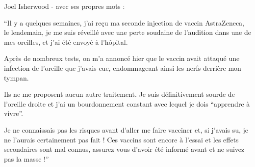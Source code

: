 Joel Isherwood - avec ses propres mots :

“Il y a quelques semaines, j'ai reçu ma seconde injection de vaccin AstraZeneca,
le lendemain, je me suis réveillé avec une perte soudaine de l'audition dans une
de mes oreilles, et j'ai été envoyé à l'hôpital.

Après de nombreux tests, on m'a annoncé hier que le vaccin avait attaqué une
infection de l'oreille que j'avais eue, endommageant ainsi les nerfs derrière
mon tympan.

Ils ne me proposent aucun autre traitement. Je suis définitivement sourde de
l'oreille droite et j'ai un bourdonnement constant avec lequel je dois
“apprendre à vivre”.

Je ne connaissais pas les risques avant d'aller me faire vacciner et, si j'avais
su, je ne l'aurais certainement pas fait ! Ces vaccins sont encore à l'essai et
les effets secondaires sont mal connus, assurez vous d'avoir été informé avant
et ne suivez pas la masse !”

